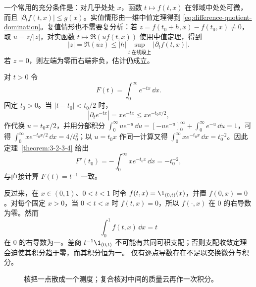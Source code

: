 一个常用的充分条件是：对几乎处处 $x$，函数 $t\mapsto f(t,x)$ 在邻域中处处可微，而且
$|\partial_tf(t,x)|\le g(x)$。实值情形由一维中值定理得到
\eqref{eq:difference-quotient-domination}。复值情形也不需要复分析：若
$z=f(t_0+h,x)-f(t_0,x)\ne0$，取 $u=z/|z|$，对实函数
$t\mapsto\Re(\overline u f(t,x))$ 使用中值定理，得到
\[
 |z|=\Re(\overline uz)
 \le |h|\sup_{t\text{ 在线段上}}|\partial_tf(t,x)|.
\]
若 $z=0$，则左端为零而右端非负，估计仍成立。

\begin{example}[成功与失败的差商]\label{ex:3-2-3-4}
对 $t>0$ 令
\[
 F(t)=\int_0^\infty e^{-tx}\,\dd x.
\]
固定 $t_0>0$。当 $|t-t_0|<t_0/2$ 时，
\[
 |\partial_te^{-tx}|=xe^{-tx}\le xe^{-t_0x/2},
\]
作代换 $u=t_0x/2$，并用分部积分
$\int_0^\infty ue^{-u}\,\dd u=[-ue^{-u}]_0^\infty+\int_0^\infty e^{-u}\,\dd u=1$，可得
$\int_0^\infty xe^{-t_0x/2}\,\dd x=4/t_0^2$；以 $u=t_0x$ 作同一计算又得
$\int_0^\infty xe^{-t_0x}\,\dd x=t_0^{-2}$。因此定理~\ref{theorem:3-2-3-4} 给出
\[
 F'(t_0)=-\int_0^\infty xe^{-t_0x}\,\dd x=-t_0^{-2},
\]
与直接计算 $F(t)=t^{-1}$ 一致。

反过来，在 $x\in(0,1)$、$0<t<1$ 时令
$f(t,x)=\1_{(0,t)}(x)$，并置 $f(0,x)=0$。对每个固定 $x>0$，当 $0<t<x$ 时
$f(t,x)=0$，所以 $f(\cdot,x)$ 在 $0$ 的右导数为零。然而
\[
 \int_0^1f(t,x)\,\dd x=t
\]
在 $0$ 的右导数为一。差商
$t^{-1}\1_{(0,t)}$ 不可能有共同可积支配；否则支配收敛定理会迫使其积分趋于零，而其积分恒为一。
仅有逐点导数存在不足以交换微分与积分。
\end{example}

\begin{figure}[htbp]
\centering
{}
\caption{核把一点散成一个测度；复合核对中间的质量云再作一次积分。}
\label{fig:3-2-3-kernel-cloud}
\end{figure}

